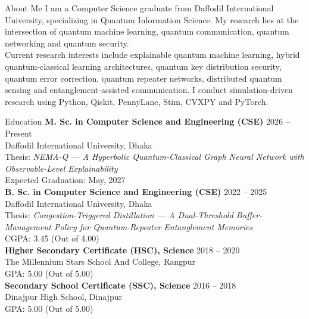 \documentclass{resume} %
\begin{document}
  


\begin{rSection}{About Me}
I am a Computer Science graduate from Daffodil International University, specializing in Quantum Information Science. My research lies at the intersection of quantum machine learning, quantum communication, quantum networking and quantum security. \vspace{.15cm} \\
Current research interests include explainable quantum machine learning, hybrid quantum-classical learning architectures, quantum key distribution security, quantum error correction, quantum repeater networks, distributed quantum sensing and entanglement-assisted communication. I conduct simulation-driven research using Python, Qiskit, PennyLane, Stim, CVXPY and PyTorch.
\end{rSection}


\begin{rSection}{Education}
{\bf M. Sc. in Computer Science and Engineering (CSE)} \hfill {2026 – Present} \\
Daffodil International University, Dhaka \\
Thesis: \textit{NEMA-Q — A Hyperbolic Quantum-Classical Graph Neural Network with Observable-Level Explainability} \\
Expected Graduation: May, 2027 \vspace{.1cm} \\
{\bf B. Sc. in Computer Science and Engineering (CSE)} \hfill {2022 – 2025} \\
Daffodil International University, Dhaka \\
Thesis: \textit{Congestion-Triggered Distillation — A Dual-Threshold Buffer-Management Policy for Quantum-Repeater Entanglement Memories} \\
CGPA: 3.45 (Out of 4.00)\vspace{.1cm} \\
{\bf Higher Secondary Certificate (HSC), Science} \hfill {2018 – 2020} \\ 
The Millennium Stars School And College, Rangpur \\
GPA: 5.00 (Out of 5.00)\vspace{.1cm} \\
{\bf Secondary School Certificate (SSC), Science} \hfill {2016 – 2018} \\ 
Dinajpur High School, Dinajpur \\
GPA: 5.00 (Out of 5.00)

\end{rSection} 
\end{document}
